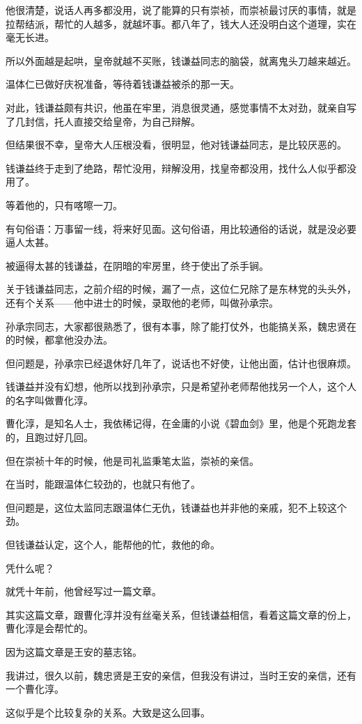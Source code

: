 \begin{multicols}{\theparacolNo}
他很清楚，说话人再多都没用，说了能算的只有崇祯，而崇祯最讨厌的事情，就是拉帮结派，帮忙的人越多，就越坏事。都八年了，钱大人还没明白这个道理，实在毫无长进。

所以外面越是起哄，皇帝就越不买账，钱谦益同志的脑袋，就离鬼头刀越来越近。

温体仁已做好庆祝准备，等待着钱谦益被杀的那一天。

对此，钱谦益颇有共识，他虽在牢里，消息很灵通，感觉事情不太对劲，就亲自写了几封信，托人直接交给皇帝，为自己辩解。

但结果很不幸，皇帝大人压根没看，很明显，他对钱谦益同志，是比较厌恶的。

钱谦益终于走到了绝路，帮忙没用，辩解没用，找皇帝都没用，找什么人似乎都没用了。

等着他的，只有喀嚓一刀。

有句俗语：万事留一线，将来好见面。这句俗语，用比较通俗的话说，就是没必要逼人太甚。

被逼得太甚的钱谦益，在阴暗的牢房里，终于使出了杀手锏。

关于钱谦益同志，之前介绍的时候，漏了一点，这位仁兄除了是东林党的头头外，还有个关系——他中进士的时候，录取他的老师，叫做孙承宗。

孙承宗同志，大家都很熟悉了，很有本事，除了能打仗外，也能搞关系，魏忠贤在的时候，都拿他没办法。

但问题是，孙承宗已经退休好几年了，说话也不好使，让他出面，估计也很麻烦。

钱谦益并没有幻想，他所以找到孙承宗，只是希望孙老师帮他找另一个人，这个人的名字叫做曹化淳。

曹化淳，是知名人士，我依稀记得，在金庸的小说《碧血剑》里，他是个死跑龙套的，且跑过好几回。

但在崇祯十年的时候，他是司礼监秉笔太监，崇祯的亲信。

在当时，能跟温体仁较劲的，也就只有他了。

但问题是，这位太监同志跟温体仁无仇，钱谦益也并非他的亲戚，犯不上较这个劲。

但钱谦益认定，这个人，能帮他的忙，救他的命。

凭什么呢？

就凭十年前，他曾经写过一篇文章。

其实这篇文章，跟曹化淳并没有丝毫关系，但钱谦益相信，看着这篇文章的份上，曹化淳是会帮忙的。

因为这篇文章是王安的墓志铭。

我讲过，很久以前，魏忠贤是王安的亲信，但我没有讲过，当时王安的亲信，还有一个曹化淳。

这似乎是个比较复杂的关系。大致是这么回事。


\end{multicols}
